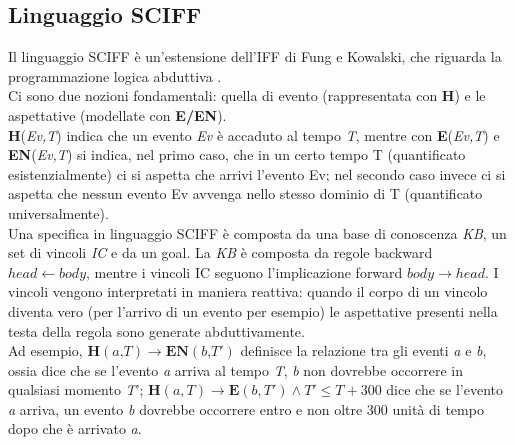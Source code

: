 \documentclass[a4paper,12pt]{report}
\begin{document}
\subsection{Linguaggio SCIFF}
Il linguaggio SCIFF è un'estensione dell'IFF di Fung e Kowalski, che riguarda la programmazione logica abduttiva \cite{rif10}.\\
Ci sono due nozioni fondamentali: quella di evento (rappresentata con \textbf{H}) e le aspettative (modellate con \textbf{E/EN}).\\
\textbf{H}(\textit{Ev,T}) indica che un evento \textit{Ev} è accaduto al tempo \textit{T}, mentre con \textbf{E}(\textit{Ev,T}) e \textbf{EN}(\textit{Ev,T}) si indica, nel primo caso, che in un certo tempo T (quantificato esistenzialmente) ci si aspetta che arrivi l'evento Ev; nel secondo caso invece ci si aspetta che nessun evento Ev avvenga nello stesso dominio di T (quantificato universalmente).\\
Una specifica in linguaggio SCIFF è composta da una base di conoscenza \textit{KB}, un set di vincoli \textit{IC} e da un goal. La \textit{KB} è composta da regole backward \textit{$head \leftarrow body$}, mentre i vincoli IC seguono l'implicazione forward \textit{$body \rightarrow head$}. I vincoli vengono interpretati in maniera reattiva: quando il corpo di un vincolo diventa vero (per l'arrivo di un evento per esempio) le aspettative presenti nella testa della regola sono generate abduttivamente.\\
Ad esempio, $\textbf{H}(\textit{a,T}) \rightarrow \textbf{EN}(\textit{b,T}')$ definisce la relazione tra gli eventi \textit{a} e \textit{b}, ossia dice che se l'evento \textit{a} arriva al tempo \textit{T}, \textit{b} non dovrebbe occorrere in qualsiasi momento \textit{T}'; $\textbf{H}(a,T) \rightarrow \textbf{E}(b,T') \wedge T' \le T + 300$ dice che se l'evento \textit{a} arriva, un evento \textit{b} dovrebbe occorrere entro e non oltre 300 unità di tempo dopo che è arrivato \textit{a}.
\newpage
\end{document}
